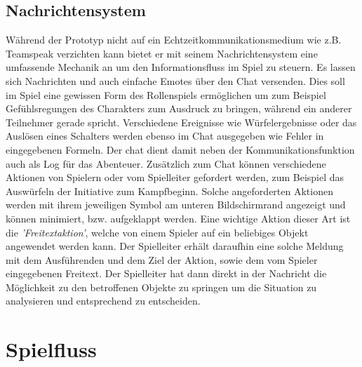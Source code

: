 \subsection{Nachrichtensystem}
\label{sec:Nachrichtensystem}
Während der Prototyp nicht auf ein Echtzeitkommunikationsmedium wie z.B. Teamspeak verzichten kann bietet er mit seinem Nachrichtensystem eine umfassende Mechanik an um den Informationsfluss im Spiel zu steuern. 
Es lassen sich Nachrichten und auch einfache Emotes über den Chat versenden. Dies soll im Spiel eine gewissen Form des Rollenspiels ermöglichen um zum Beispiel Gefühlsregungen des Charakters zum Ausdruck zu bringen, während ein anderer Teilnehmer gerade spricht. Verschiedene Ereignisse wie Würfelergebnisse oder das Auslösen eines Schalters werden ebenso im Chat ausgegeben wie Fehler in eingegebenen Formeln. Der chat dient damit neben der Kommunikationsfunktion auch als Log für das Abenteuer.\newline
Zusätzlich zum Chat können verschiedene Aktionen von Spielern oder vom Spielleiter gefordert werden, zum Beispiel das Auswürfeln der Initiative zum Kampfbeginn. Solche angeforderten Aktionen werden mit ihrem jeweiligen Symbol am unteren Bildschirmrand angezeigt und können minimiert, bzw. aufgeklappt werden.\newline
Eine wichtige Aktion dieser Art ist die \emph{'Freitextaktion'}, welche von einem Spieler auf ein beliebiges Objekt angewendet werden kann. Der Spielleiter erhält daraufhin eine solche Meldung mit dem Ausführenden und dem Ziel der Aktion, sowie dem vom Spieler eingegebenen Freitext. Der Spielleiter hat dann direkt in der Nachricht die Möglichkeit zu den betroffenen Objekte zu springen um die Situation zu analysieren und entsprechend zu entscheiden.


\section{Spielfluss}
\label{sec:Spielfluss}



